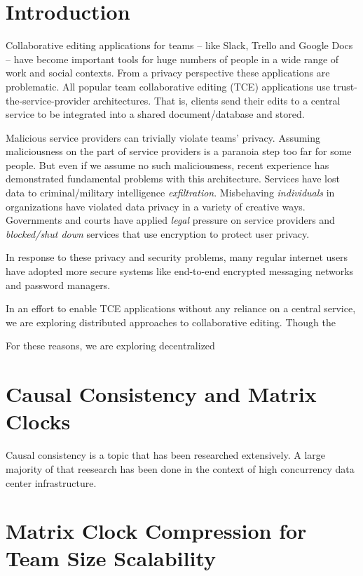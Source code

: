 \documentclass[runningheads]{llncs}
\begin{document}
\section{Introduction}

Collaborative editing applications for teams -- like Slack, Trello and Google Docs -- have become important tools for huge numbers of people in a wide range of work and social contexts.
From a privacy perspective these applications are problematic.
All popular team collaborative editing (TCE) applications use trust-the-service-provider architectures.
That is, clients send their edits to a central service to be integrated into a shared document{\slash}database and stored.

Malicious service providers can trivially violate teams' privacy.
Assuming maliciousness on the part of service providers is a paranoia step too far for some people.
But even if we assume no such maliciousness, recent experience has demonstrated fundamental problems with this architecture.
Services have lost data to criminal{\slash}military intelligence \emph{exfiltration}.
Misbehaving \emph{individuals} in organizations have violated data privacy in a variety of creative ways.
Governments and courts have applied \emph{legal} pressure on service providers and \emph{blocked{\slash}shut down} services that use encryption to protect user privacy.

In response to these privacy and security problems, many regular internet users have adopted more secure systems like end-to-end encrypted messaging networks and password managers.


In an effort to enable TCE applications without any reliance on a central service, we are exploring distributed approaches to collaborative editing.
Though the

For these reasons, we are exploring decentralized

\section{Causal Consistency and Matrix Clocks}

Causal consistency is a topic that has been researched extensively.
A large majority of that reesearch has been done in the context of high concurrency data center infrastructure.


\section{Matrix Clock Compression for Team Size Scalability}
\end{document}
